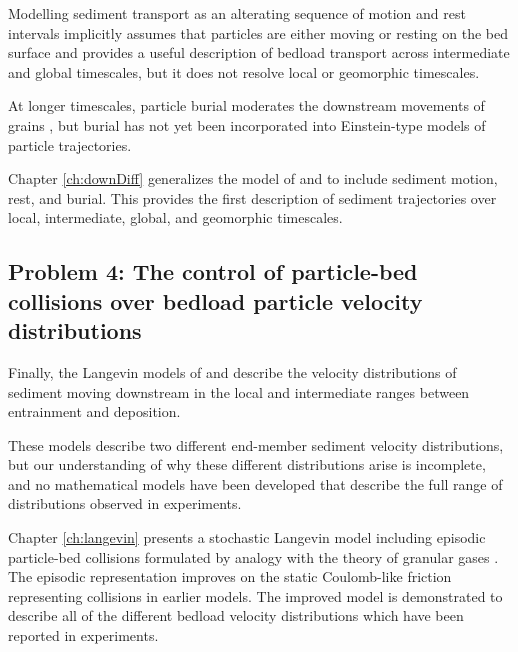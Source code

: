 Modelling sediment transport as an alterating sequence of motion and rest intervals implicitly assumes that particles are either moving or resting on the bed surface and provides a useful description of bedload transport across intermediate and global timescales, but it does not resolve local or geomorphic timescales.

At longer timescales, particle burial moderates the downstream movements of grains \citep{Hassan2017}, but burial has not yet been incorporated into Einstein-type models of particle trajectories. 

Chapter \ref{ch:downDiff} generalizes the model of \citet{Lisle1998} and \citet{Lajeunesse2017} to include sediment motion, rest, and burial.
This provides the first description of sediment trajectories over local, intermediate, global, and geomorphic timescales.

\subsection{Problem 4: The control of particle-bed collisions over bedload particle velocity distributions}

Finally, the Langevin models of \citet{Fan2014} and \citet{Ancey2014} describe the velocity distributions of sediment moving downstream in the local and intermediate ranges between entrainment and deposition.

These models describe two different end-member sediment velocity distributions, but our understanding of why these different distributions arise is incomplete, and no mathematical models have been developed that describe the full range of distributions observed in experiments.

Chapter \ref{ch:langevin} presents a stochastic Langevin model including episodic particle-bed collisions formulated by analogy with the theory of granular gases \citep{Brilliantov2004}.
The episodic representation improves on the static Coulomb-like friction representing collisions in earlier models.
The improved model is demonstrated to describe all of the different bedload velocity distributions which have been reported in experiments.


\endinput


An alternative statistical formulation of the sediment flux provides an approximate correspondence between these two definitions \citep{Ancey2006,Furbish2012}.
This hinges on the probability $P[\textbf{u}_p | \textbf{x},t]$ that a particle contacts a control surface $S$ at position $\textbf{x}$ and time $t$ with velocity $\textbf{u}_p$. 
This conditional probability is considered to result from a very large collection of identical systems selected at random moments in their evolution: that is, the conditional probability is an ensemble quantity \citep{Kittel1958}.  


